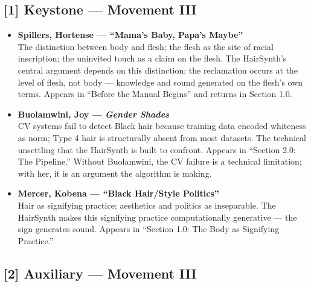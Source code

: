 \subsection*{[1] Keystone — Movement III}

\begin{itemize}

    \item \textbf{Spillers, Hortense — ``Mama's Baby, Papa's Maybe''} \parencite{Spillers_1987}\\
    The distinction between body and flesh; the flesh as the site of racial inscription; the uninvited touch as a claim on the flesh. The HairSynth's central argument depends on this distinction: the reclamation occurs at the level of flesh, not body — knowledge and sound generated on the flesh's own terms. Appears in ``Before the Manual Begins'' and returns in Section 1.0.

    \item \textbf{Buolamwini, Joy — \textit{Gender Shades}} \parencite{Buolamwini_2018}\\
    CV systems fail to detect Black hair because training data encoded whiteness as norm; Type 4 hair is structurally absent from most datasets. The technical unsettling that the HairSynth is built to confront. Appears in ``Section 2.0: The Pipeline.'' Without Buolamwini, the CV failure is a technical limitation; with her, it is an argument the algorithm is making.

    \item \textbf{Mercer, Kobena — ``Black Hair/Style Politics''} \parencite{Mercer_1987}\\
    Hair as signifying practice; aesthetics and politics as inseparable. The HairSynth makes this signifying practice computationally generative — the sign generates sound. Appears in ``Section 1.0: The Body as Signifying Practice.''

\end{itemize}

\subsection*{[2] Auxiliary — Movement III}

